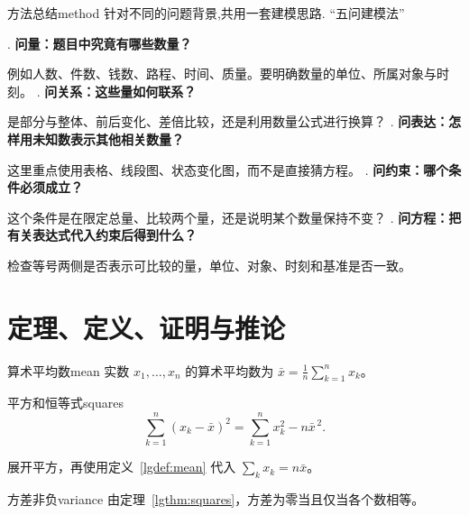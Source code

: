 \documentclass[UTF8,fontset=fandol,12pt,oneside]{ctexbook}
\begin{document}
\setcounter{chapter}{3}
\setcounter{section}{4}
\noindent
\begin{lgproposition}{方法总结}{method}
   针对不同的问题背景,共用一套建模思路. ``五问建模法''
   \begin{lgtimeline}
      . \textbf{问量：题目中究竟有哪些数量？}
   
   例如人数、件数、钱数、路程、时间、质量。要明确数量的单位、所属对象与时刻。
      . \textbf{问关系：这些量如何联系？}
   
   是部分与整体、前后变化、差倍比较，还是利用数量公式进行换算？
      . \textbf{问表达：怎样用未知数表示其他相关数量？}
   
   这里重点使用表格、线段图、状态变化图，而不是直接猜方程。
      . \textbf{问约束：哪个条件必须成立？}
   
   这个条件是在限定总量、比较两个量，还是说明某个数量保持不变？
      . \textbf{问方程：把有关表达式代入约束后得到什么？}
   
   检查等号两侧是否表示可比较的量，单位、对象、时刻和基准是否一致。
   \end{lgtimeline}
\end{lgproposition}

\clearpage
\section*{定理、定义、证明与推论}
\begin{lgdefinition}{算术平均数}{mean}
实数 $x_1,\ldots,x_n$ 的算术平均数为
$\bar{x}=\frac1n\sum_{k=1}^n x_k$。
\end{lgdefinition}

\begin{lgtheorem}{平方和恒等式}{squares}
\[\sum_{k=1}^n(x_k-\bar{x})^2=\sum_{k=1}^n x_k^2-n\bar{x}^{\,2}.\]
\end{lgtheorem}

\begin{lgproof}
展开平方，再使用定义~\ref{lgdef:mean} 代入 $\sum_k x_k=n\bar{x}$。
\end{lgproof}

\begin{lgcorollary}{方差非负}{variance}
由定理~\ref{lgthm:squares}，方差为零当且仅当各个数相等。
\end{lgcorollary}

\clearpage
\end{document}
